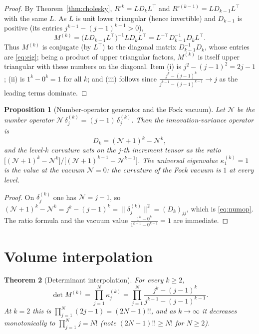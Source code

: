 \documentclass[11pt,reqno]{amsart}
\theoremstyle{plain}
\newtheorem{theorem}{Theorem}[section]
\newtheorem{proposition}[theorem]{Proposition}
\theoremstyle{definition}
\newcommand{\Had}{\mathbin{\circ}}     %
\newcommand{\Num}{\mathcal{N}}         %
\begin{document}
\begin{proof}
By Theorem~\ref{thm:cholesky}, $R^{\Had k}=LD_kL^{\top}$ and
$R^{\Had(k-1)}=LD_{k-1}L^{\top}$ with the same $L$. As $L$ is unit lower
triangular (hence invertible) and $D_{k-1}$ is positive (its entries
$j^{k-1}-(j-1)^{k-1}>0$),
\[
  M^{(k)}=\bigl(LD_{k-1}L^{\top}\bigr)^{-1}LD_kL^{\top}
  =L^{-\top}D_{k-1}^{-1}D_kL^{\top}.
\]
Thus $M^{(k)}$ is conjugate (by $L^{\top}$) to the diagonal matrix
$D_{k-1}^{-1}D_k$, whose entries are \eqref{eq:eig}; being a product of upper
triangular factors, $M^{(k)}$ is itself upper triangular with these numbers on
the diagonal. Item (i) is
$j^{2}-(j-1)^{2}=2j-1$; (ii) is $1^{k}-0^{k}=1$ for all $k$; and (iii) follows
since $\frac{j^{k}-(j-1)^{k}}{j^{k-1}-(j-1)^{k-1}}\to j$ as the leading terms
dominate.
\end{proof}

\begin{proposition}[Number-operator generator and the Fock vacuum]\label{prop:fock}
Let $\Num$ be the number operator $\Num\,\delta_j^{(k)}=(j-1)\,\delta_j^{(k)}$.
Then the innovation-variance operator is
\begin{equation}\label{eq:numop}
  D_k=(\Num+1)^{k}-\Num^{k},
\end{equation}
and the level-$k$ curvature acts on the $j$-th increment tensor as the ratio
$\bigl[(\Num+1)^{k}-\Num^{k}\bigr]\big/\bigl[(\Num+1)^{k-1}-\Num^{k-1}\bigr]$.
The universal eigenvalue $\kappa_1^{(k)}=1$ is the value at the vacuum $\Num=0$:
the curvature of the Fock vacuum is $1$ at every level.
\end{proposition}

\begin{proof}
On $\delta_j^{(k)}$ one has $\Num=j-1$, so $(\Num+1)^{k}-\Num^{k}=j^{k}-(j-1)^{k}
=\|\delta_j^{(k)}\|^{2}=(D_k)_{jj}$, which is \eqref{eq:numop}. The ratio formula
and the vacuum value $\frac{1^{k}-0^{k}}{1^{k-1}-0^{k-1}}=1$ are immediate.
\end{proof}

\section{Volume interpolation}\label{sec:vol}

\begin{theorem}[Determinant interpolation]\label{thm:det}
For every $k\ge2$,
\begin{equation}\label{eq:det}
  \det M^{(k)}=\prod_{j=1}^{N}\kappa_j^{(k)}
  =\prod_{j=1}^{N}\frac{j^{k}-(j-1)^{k}}{j^{k-1}-(j-1)^{k-1}} .
\end{equation}
At $k=2$ this is $\prod_{j=1}^{N}(2j-1)=(2N-1)!!$, and as $k\to\infty$ it
\emph{decreases} monotonically to $\prod_{j=1}^{N}j=N!$ \textup(note
$(2N-1)!!\ge N!$ for $N\ge2$\textup).
\end{theorem}
\end{document}
